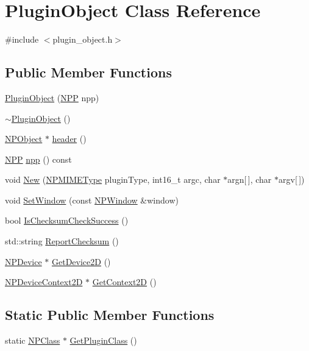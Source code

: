 \hypertarget{class_plugin_object}{
\section{PluginObject Class Reference}
\label{class_plugin_object}
}


{\ttfamily \#include $<$plugin\_\-object.h$>$}

\subsection*{Public Member Functions}
\begin{DoxyCompactItemize}
\item 
\hyperlink{class_plugin_object_ab24118f5b174beacb1b7f652bbbcf78d}{PluginObject} (\hyperlink{struct___n_p_p}{NPP} npp)
\item 
\hyperlink{class_plugin_object_ab2a72410c84a20133db4dec8ca92b277}{$\sim$PluginObject} ()
\item 
\hyperlink{struct_n_p_object}{NPObject} $\ast$ \hyperlink{class_plugin_object_ac551056ed0941b76c4161ba71e4cf449}{header} ()
\item 
\hyperlink{struct___n_p_p}{NPP} \hyperlink{class_plugin_object_a1a051ee92618bae8134b4d273d1d9982}{npp} () const 
\item 
void \hyperlink{class_plugin_object_a5e103c3aefcd2afb642c2414b92311ac}{New} (\hyperlink{npapi_8h_a6ab16d9f607aeb576061783638ae2973}{NPMIMEType} pluginType, int16\_\-t argc, char $\ast$argn\mbox{[}$\,$\mbox{]}, char $\ast$argv\mbox{[}$\,$\mbox{]})
\item 
void \hyperlink{class_plugin_object_a2a2774a67eadffc3f78d60e6c0559cf0}{SetWindow} (const \hyperlink{struct___n_p_window}{NPWindow} \&window)
\item 
bool \hyperlink{class_plugin_object_a4f594d05bd890649ca0f87ce30f03d26}{IsChecksumCheckSuccess} ()
\item 
std::string \hyperlink{class_plugin_object_a0ab936e960c08282554224a4570540aa}{ReportChecksum} ()
\item 
\hyperlink{struct_n_p_device}{NPDevice} $\ast$ \hyperlink{class_plugin_object_a0678b6675237f65d7679a400759b5c29}{GetDevice2D} ()
\item 
\hyperlink{struct___n_p_device_context2_d}{NPDeviceContext2D} $\ast$ \hyperlink{class_plugin_object_ad121e4145b1f1cdcf878208919859e31}{GetContext2D} ()
\end{DoxyCompactItemize}
\subsection*{Static Public Member Functions}
\begin{DoxyCompactItemize}
\item 
static \hyperlink{struct_n_p_class}{NPClass} $\ast$ \hyperlink{class_plugin_object_a4b017230102036f1626af06df4864a95}{GetPluginClass} ()
\end{DoxyCompactItemize}
